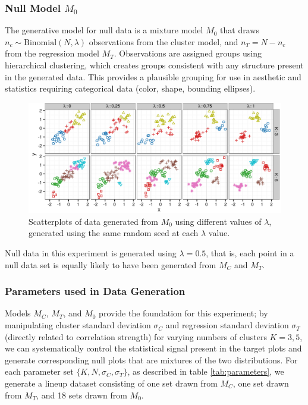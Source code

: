 \documentclass[11pt]{isuthesis}\usepackage[]{graphicx}\usepackage[]{color}
\newenvironment{knitrout}{}{} %
\begin{document}
\subsubsection{Null Model $M_0$}
The generative model for null data is a mixture model $M_0$ that draws $n_c \sim \text{Binomial}(N, \lambda)$ observations from the cluster model, and $n_T = N - n_c$ from the regression model $M_T$. Observations are assigned groups using hierarchical clustering, which creates groups consistent with any structure present in the generated data. This provides a plausible grouping for use in aesthetic and statistics requiring categorical data (color, shape, bounding ellipses). 

\begin{figure}[ht]
\begin{knitrout}
\color{fgcolor}

{\centering \includegraphics[width=\linewidth]{Figure/FeatureHierarchy/fig-lambda-1} 

}



\end{knitrout}
\caption[Mixing parameter for null model $M_0$]{\label{fig:lambda} Scatterplots of data generated from $M_0$ using different values of $\lambda$, generated using the same random seed at each $\lambda$ value.}
\end{figure}
Null data in this experiment is generated using $\lambda = 0.5$, that is, each point in a null data set is equally likely to have been generated from $M_C$ and $M_T$. 

\subsubsection{Parameters used in Data Generation}\label{sec:parameters}
Models $M_C$, $M_T$, and $M_0$ provide the foundation for this experiment; by manipulating cluster standard deviation $\sigma_C$ and regression standard deviation $\sigma_T$ (directly related to correlation strength) for varying numbers of clusters $K=3, 5$, we can systematically control the statistical signal present in the target plots and generate corresponding null plots that are mixtures of the two distributions. For each parameter set $\{K, N, \sigma_C, \sigma_T\}$, as described in table \ref{tab:parameters}, we  generate a lineup dataset consisting of one set drawn from $M_C$, one set drawn from $M_T$, and 18 sets drawn from $M_0$. 
\end{document}
